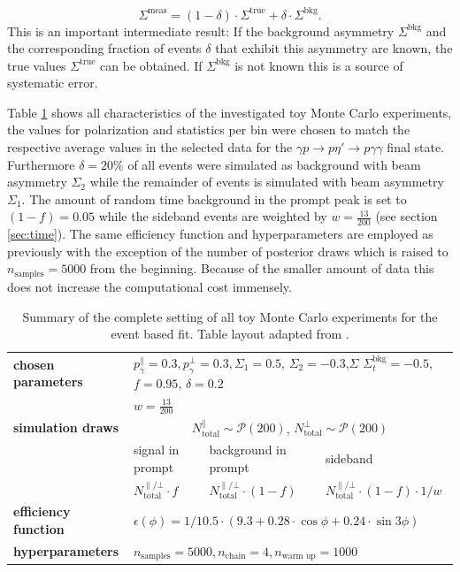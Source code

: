 \begin{equation}
	\Sigma^\text{meas}=\left(1-\delta\right)\cdot\Sigma^{\text{true}}+\delta\cdot\Sigma^{\text{bkg}}.
	\label{eq:sigmeas}
\end{equation}
This is an important intermediate result: If the background asymmetry $\Sigma^\text{bkg}$ and the corresponding fraction of events $\delta$ that exhibit this asymmetry are known, the true values $\Sigma^\text{true}$ can be obtained. If $\Sigma^\text{bkg}$ is not known this is a source of systematic error.

Table \ref{tab:mcsum1} shows all characteristics of the investigated toy Monte Carlo experiments, the values for polarization and statistics per bin were chosen to match the respective average values in the selected data for the $\gamma p \to p\eta'\to p\gamma\gamma$ final state. Furthermore $\delta=20\%$ of all events were simulated as background with beam asymmetry $\Sigma_2$ while the remainder of events is simulated with beam asymmetry $\Sigma_1$. The amount of random time background in the prompt peak is set to $(1-f)=0.05$ while the sideband events are weighted by $w=\frac{13}{200}$ (see section \ref{sec:time}). The same efficiency function and hyperparameters are employed as previously with the exception of the number of posterior draws which is raised to $n_\text{samples}=5000$ from the beginning. Because of the smaller amount of data this does not increase the computational cost immensely.
\begin{table}[htbp]
	
	\renewcommand{\arraystretch}{1.5}
	\centering
	\begin{tabularx}{\linewidth}{l|XXX}
		\toprule
		\textbf{chosen parameters} & \multicolumn{3}{l}{$p_\gamma^\parallel=0.3,p_\gamma^\bot=0.3,\Sigma_1=0.5$, $\Sigma_2=-0.3$,$\Sigma$ $\Sigma^\text{bkg}_t=-0.5$, $f=0.95$, $\delta=0.2$}\\ &\multicolumn{3}{l}{$w=\frac{13}{200}$}\\
		\hline
		\textbf{simulation draws} &\multicolumn{3}{c}{$ N^\parallel_{\text{total}}\sim\mathcal{P}(200)$, $ N^\bot_{\text{total}}\sim\mathcal{P}(200)$}\\
		\cline{2-4}
		&signal in prompt&background in prompt& sideband \\
		&$N^{\parallel/\bot}_\text{total}\cdot f$&$N^{\parallel/\bot}_\text{total}\cdot\left(1-f\right)$&$N^{\parallel/\bot}_\text{total}\cdot\left(1-f\right)\cdot1/w$\\
		\hline
		\textbf{efficiency function}&\multicolumn{3}{l}{$\epsilon\left(\phi\right)=1/10.5\cdot\left(9.3+0.28\cdot\cos\phi+0.24\cdot\sin3\phi\right)$}\\
		\hline
		\textbf{hyperparameters}&\multicolumn{3}{l}{$n_\text{samples}=5000,n_\text{chain}=4,n_\text{warm up}=1000$}\\
		\bottomrule
	\end{tabularx}
	\caption{Summary of the complete setting of all toy Monte Carlo experiments for the event based fit. Table layout adapted from \cite{farahphd}.}
	\label{tab:mcsum1}
\end{table}
